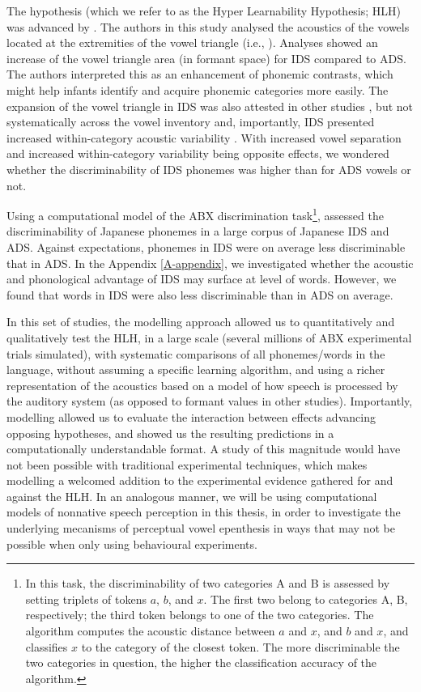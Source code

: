 The hypothesis (which we refer to as the Hyper Learnability Hypothesis; HLH) was advanced by \cite{kuhl1997}. The authors in this study analysed the acoustics of the vowels located at the extremities of the vowel triangle (i.e., ). Analyses showed an increase of the vowel triangle area (in formant space) for IDS compared to ADS. The authors interpreted this as an enhancement of phonemic contrasts, which might help infants identify and acquire phonemic categories more easily. The expansion of the vowel triangle in IDS was also attested in other studies \cite{andruski1999, bernstein1984, burnham2002, cristia2014, liu2003, mcmurray2013, uther2007}, but not systematically across the vowel inventory \cite{cristia2014} and, importantly, IDS presented increased within-category acoustic variability \cite{mcmurray2013, cristia2014, kirchoff2005}. With increased vowel separation and increased within-category variability being opposite effects, we wondered whether the discriminability of IDS phonemes was higher than for ADS vowels or not.

Using a computational model of the ABX discrimination task\footnote{In this task, the discriminability of two categories \textsc{A} and \textsc{B} is assessed by setting triplets of tokens $a$, $b$, and $x$. The first two belong to categories \textsc{A}, \textsc{B}, respectively; the third token belongs to one of the two categories. The algorithm computes the acoustic distance between $a$ and $x$, and $b$ and $x$, and classifies $x$ to the category of the closest token. The more discriminable the two categories in question, the higher the classification accuracy of the algorithm.}, \cite{martin2015} assessed the discriminability of Japanese phonemes in a large corpus of Japanese IDS and ADS. Against expectations, phonemes in IDS were on average less discriminable that in ADS. In the Appendix \ref{A-appendix}, we investigated whether the acoustic and phonological advantage of IDS may surface at level of words. However, we found that words in IDS were also less discriminable than in ADS on average. 

In this set of studies, the modelling approach allowed us to quantitatively and qualitatively test the HLH, in a large scale (several millions of ABX experimental trials simulated), with systematic comparisons of all phonemes/words in the language, without assuming a specific learning algorithm, and using a richer representation of the acoustics based on a model of how speech is processed by the auditory system (as opposed to formant values in other studies). Importantly, modelling allowed us to evaluate the interaction between effects advancing opposing hypotheses, and showed us the resulting predictions in a computationally understandable format. A study of this magnitude would have not been possible with traditional experimental techniques, which makes modelling a welcomed addition to the experimental evidence gathered for and against the HLH. In an analogous manner, we will be using computational models of nonnative speech perception in this thesis, in order to investigate the underlying mecanisms of perceptual vowel epenthesis in ways that may not be possible when only using behavioural experiments.  


